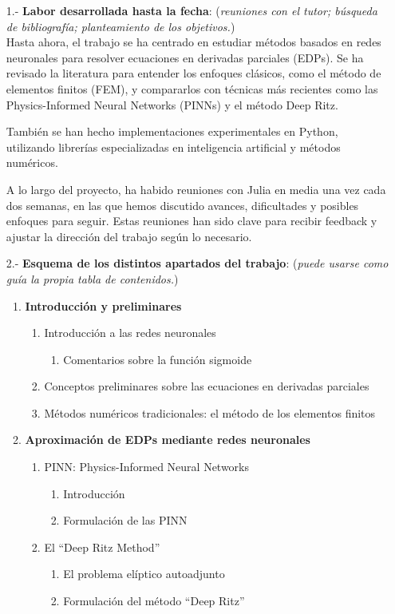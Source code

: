 \documentclass{article}
\begin{document}
\begin{enumerate}

\item[1.-] {\bf Labor desarrollada hasta la fecha}: (\textit{reuniones con el tutor; búsqueda de bibliograf\'ia; planteamiento de los objetivos.})
\\
Hasta ahora, el trabajo se ha centrado en estudiar métodos basados en redes neuronales para resolver ecuaciones en derivadas parciales (EDPs). Se ha revisado la literatura para entender los enfoques clásicos, como el método de elementos finitos (FEM), y compararlos con técnicas más recientes como las Physics-Informed Neural Networks (PINNs) y el método Deep Ritz.

También se han hecho implementaciones experimentales en Python, utilizando librerías especializadas en inteligencia artificial y métodos numéricos.

A lo largo del proyecto, ha habido reuniones con Julia en media una vez cada dos semanas, en las que hemos discutido avances, dificultades y posibles enfoques para seguir. Estas reuniones han sido clave para recibir feedback y ajustar la dirección del trabajo según lo necesario.

\item[2.-] {\bf Esquema de los distintos apartados del trabajo}: (\textit{puede usarse como gu\'ia la propia tabla de contenidos.})

\begin{enumerate}
    \item \textbf{Introducción y preliminares}
    \begin{enumerate}
        \item Introducción a las redes neuronales
        \begin{enumerate}
            \item Comentarios sobre la función sigmoide
        \end{enumerate}
        \item Conceptos preliminares sobre las ecuaciones en derivadas parciales
        \item Métodos numéricos tradicionales: el método de los elementos finitos
    \end{enumerate}

    \item \textbf{Aproximación de EDPs mediante redes neuronales}
    \begin{enumerate}
        \item PINN: Physics-Informed Neural Networks
        \begin{enumerate}
            \item Introducción
            \item Formulación de las PINN
        \end{enumerate}
        \item El ``Deep Ritz Method''
        \begin{enumerate}
            \item El problema elíptico autoadjunto
            \item Formulación del método ``Deep Ritz''
        \end{enumerate}
    \end{enumerate}


\end{enumerate}
\end{enumerate}
\end{document}
